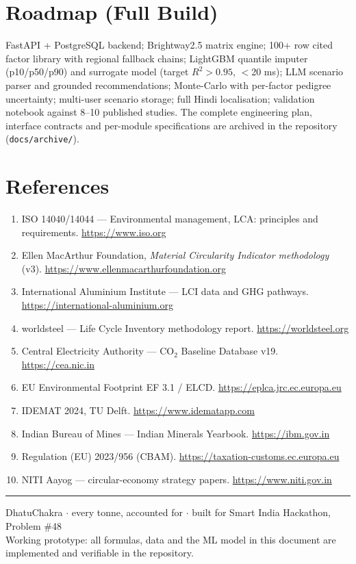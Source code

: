 \documentclass[11pt,a4paper]{article}
\begin{document}
\section{Roadmap (Full Build)}

FastAPI + PostgreSQL backend; Brightway2.5 matrix engine; 100+ row cited factor library
with regional fallback chains; LightGBM quantile imputer (p10/p50/p90) and surrogate model
(target $R^2 > 0.95$, $<$20 ms); LLM scenario parser and grounded recommendations;
Monte-Carlo with per-factor pedigree uncertainty; multi-user scenario storage; full Hindi
localisation; validation notebook against 8--10 published studies. The complete engineering
plan, interface contracts and per-module specifications are archived in the repository
(\texttt{docs/archive/}).

\section*{References}
\begin{enumerate}[leftmargin=1.6em, itemsep=0pt]
  \item ISO 14040/14044 --- Environmental management, LCA: principles and requirements. \url{https://www.iso.org}
  \item Ellen MacArthur Foundation, \emph{Material Circularity Indicator methodology} (v3). \url{https://www.ellenmacarthurfoundation.org}
  \item International Aluminium Institute --- LCI data and GHG pathways. \url{https://international-aluminium.org}
  \item worldsteel --- Life Cycle Inventory methodology report. \url{https://worldsteel.org}
  \item Central Electricity Authority --- CO$_2$ Baseline Database v19. \url{https://cea.nic.in}
  \item EU Environmental Footprint EF 3.1 / ELCD. \url{https://eplca.jrc.ec.europa.eu}
  \item IDEMAT 2024, TU Delft. \url{https://www.idematapp.com}
  \item Indian Bureau of Mines --- Indian Minerals Yearbook. \url{https://ibm.gov.in}
  \item Regulation (EU) 2023/956 (CBAM). \url{https://taxation-customs.ec.europa.eu}
  \item NITI Aayog --- circular-economy strategy papers. \url{https://www.niti.gov.in}
\end{enumerate}

\vspace{10pt}
\hrule
\vspace{6pt}
\begin{center}
\small\color{inksoft}
DhatuChakra $\cdot$ every tonne, accounted for $\cdot$ built for Smart India Hackathon, Problem \#48\\
Working prototype: all formulas, data and the ML model in this document are implemented and verifiable in the repository.
\end{center}
\end{document}
